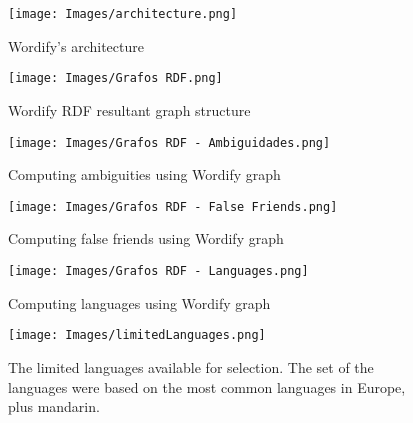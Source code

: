 \documentclass[twocolumn,twoside,11pt,a4paper]{article}
\begin{document}
\begin{figure*}
  \begin{center}
    \leavevmode
    \texttt{[image: Images/architecture.png]}
    \caption{Wordify's architecture}
    \label{fig:architecture}
  \end{center}
\end{figure*}

\begin{figure*}
  \begin{center}
    \leavevmode
    \texttt{[image: Images/Grafos RDF.png]}
    \caption{Wordify RDF resultant graph structure}
    \label{fig:graph}
  \end{center}
\end{figure*}

\begin{figure*}
  \begin{center}
    \leavevmode
    \texttt{[image: Images/Grafos RDF - Ambiguidades.png]}
    \caption{Computing ambiguities using Wordify graph}
    \label{fig:graph-ambiguities}
  \end{center}
\end{figure*}

\begin{figure*}
  \begin{center}
    \leavevmode
    \texttt{[image: Images/Grafos RDF - False Friends.png]}
    \caption{Computing false friends using Wordify graph}
    \label{fig:graph-ff}
  \end{center}
\end{figure*}

\begin{figure*}
  \begin{center}
    \leavevmode
    \texttt{[image: Images/Grafos RDF - Languages.png]}
    \caption{Computing languages using Wordify graph}
    \label{fig:graph-languages}
  \end{center}
\end{figure*}

\begin{figure*}
  \begin{center}
    \leavevmode
    \texttt{[image: Images/limitedLanguages.png]}
    \caption{The limited languages available for selection. The set of the languages were based on the most common languages in Europe, plus mandarin.}
    \label{fig:limitedLanguages}
  \end{center}
\end{figure*}
\end{document}
